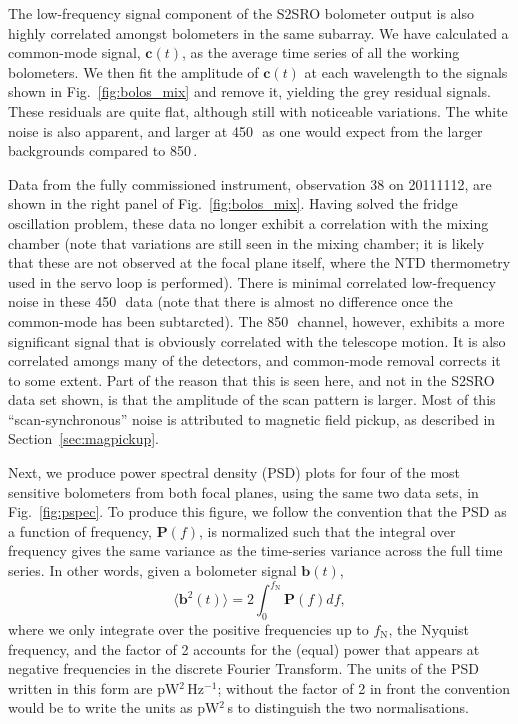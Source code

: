 \documentclass[useAMS,usenatbib,nofootinbib]{mn2e}
\begin{document}
The low-frequency signal component of the S2SRO bolometer output is
also highly correlated amongst bolometers in the same subarray. We
have calculated a common-mode signal, $\mathbf{c}(t)$, as the average
time series of all the working bolometers. We then fit the amplitude
of $\mathbf{c}(t)$ at each wavelength to the signals shown in
Fig.~\ref{fig:bolos_mix} and remove it, yielding the grey residual
signals. These residuals are quite flat, although still with
noticeable variations. The white noise is also apparent, and larger at
450\,\micron\ as one would expect from the larger backgrounds compared
to 850\,\micron.

Data from the fully commissioned instrument, observation 38 on
20111112, are shown in the right panel of
Fig.~\ref{fig:bolos_mix}. Having solved the fridge oscillation
problem, these data no longer exhibit a correlation with the mixing
chamber (note that variations are still seen in the mixing chamber; it
is likely that these are not observed at the focal plane itself, where
the NTD thermometry used in the servo loop is performed). There is
minimal correlated low-frequency noise in these 450\,\micron\ data
(note that there is almost no difference once the common-mode has been
subtarcted). The 850\,\micron\ channel, however, exhibits a more
significant signal that is obviously correlated with the telescope
motion. It is also correlated amongs many of the detectors, and
common-mode removal corrects it to some extent. Part of the reason
that this is seen here, and not in the S2SRO data set shown, is that
the amplitude of the scan pattern is larger. Most of this
``scan-synchronous'' noise is attributed to magnetic field pickup, as
described in Section~\ref{sec:magpickup}.

Next, we produce power spectral density (PSD) plots for four of the
most sensitive bolometers from both focal planes, using the same two
data sets, in Fig.~\ref{fig:pspec}. To produce this figure, we follow
the convention that the PSD as a function of frequency,
$\mathbf{P}(f)$, is normalized such that the integral over frequency
gives the same variance as the time-series variance across the full
time series. In other words, given a bolometer signal $\mathbf{b}(t)$,
%
\begin{equation}
\label{eq:psd}
\langle\mathbf{b}^2(t)\rangle = 2 \int_0^{f_\mathrm{N}} \mathbf{P}(f)
df ,
\end{equation}
%
where we only integrate over the positive frequencies up to
$f_\mathrm{N}$, the Nyquist frequency, and the factor of 2 accounts
for the (equal) power that appears at negative frequencies in the
discrete Fourier Transform. The units of the PSD written in this form
are pW$^2$\,Hz$^{-1}$; without the factor of 2 in front the convention
would be to write the units as pW$^2$\,s to distinguish the two
normalisations.
\end{document}
